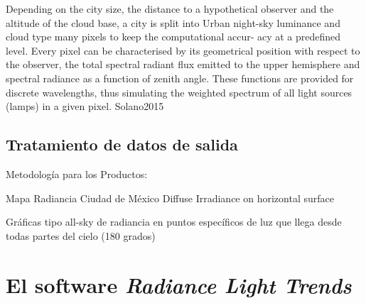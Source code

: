 Depending on the city size, the
distance to a hypothetical observer and the
altitude of the cloud base, a city is split into
Urban night-sky luminance and cloud type 
many pixels to keep the computational accur-
acy at a predefined level. Every pixel can be
characterised by its geometrical position with
respect to the observer, the total spectral
radiant flux emitted to the upper hemisphere
and spectral radiance as a function of zenith
angle. These functions are provided for
discrete wavelengths, thus simulating the
weighted spectrum of all light sources
(lamps) in a given pixel. Solano2015




\subsection{Tratamiento de datos de salida}
Metodología para los Productos:

Mapa Radiancia Ciudad de México
Diffuse Irradiance on horizontal surface


Gráficas tipo all-sky de radiancia en puntos específicos de luz que llega desde todas partes del cielo (180 grados)\\

\section{El software \textit{Radiance Light Trends}}


